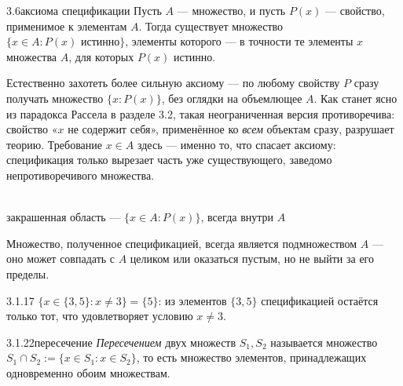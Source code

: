 \begin{axiom}{3.6}{аксиома спецификации}
Пусть $A$ — множество, и пусть $P(x)$ — свойство, применимое к элементам $A$. Тогда
существует множество $\{x \in A : P(x)\text{ истинно}\}$, элементы которого — в точности
те элементы $x$ множества $A$, для которых $P(x)$ истинно.
\end{axiom}

\begin{intuition}
Естественно захотеть более сильную аксиому — по любому свойству $P$ сразу получать множество
$\{x : P(x)\}$, без оглядки на объемлющее $A$. Как станет ясно из парадокса Рассела в
разделе 3.2, такая неограниченная версия противоречива: свойство «$x$ не содержит себя»,
применённое ко \emph{всем} объектам сразу, разрушает теорию. Требование $x \in A$ здесь —
именно то, что спасает аксиому: спецификация только вырезает часть уже существующего,
заведомо непротиворечивого множества.

\begin{center}
\\
{\footnotesize\color{intuitiongray}закрашенная область — $\{x\in A : P(x)\}$, всегда внутри
$A$}
\end{center}
\end{intuition}

\begin{remark}
Множество, полученное спецификацией, всегда является подмножеством $A$ — оно может
совпадать с $A$ целиком или оказаться пустым, но не выйти за его пределы.
\end{remark}

\begin{example}{3.1.17}{}
$\{x \in \{3,5\} : x \neq 3\} = \{5\}$: из элементов $\{3,5\}$ спецификацией остаётся только
тот, что удовлетворяет условию $x \neq 3$.
\end{example}

\begin{definition}{3.1.22}{пересечение}
\emph{Пересечением} двух множеств $S_1,S_2$ называется множество
$S_1 \cap S_2 := \{x \in S_1 : x \in S_2\}$, то есть множество элементов, принадлежащих
одновременно обоим множествам.
\end{definition}

